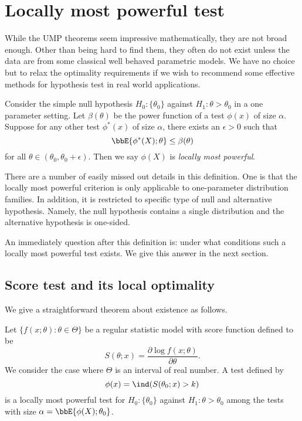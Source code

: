 \chapter{Locally most powerful test}

While the UMP theorems seem impressive mathematically,
they are not broad enough. Other than being hard to find them,
they often do not exist unless the data are from
some classical well behaved parametric models.
We have no choice but to relax the optimality requirements
if we wish to recommend some effective methods for hypothesis test
in real world applications.

\begin{defi}
Consider the simple null hypothesis $H_0: \{ \theta_0\}$
against $H_1: \theta > \theta_0$ in a one parameter setting.
Let $\beta(\theta)$ be the power function of
a test $\phi(x)$ of size $\alpha$.
Suppose for any other test $\phi^*(x)$ of size $\alpha$, 
there exists an $\epsilon > 0$ such that 
\[
\bbE\{ \phi^*(X) ; \theta\} \leq \beta(\theta)
\]
for all $\theta \in (\theta_0, \theta_0+ \epsilon)$. 
Then we say $\phi(X)$ is {\it locally most powerful}.
\end{defi}

There are a number of easily missed out details in this definition.
One is that the locally most powerful criterion is only applicable
to one-parameter distribution families. In addition, it is
restricted to specific type of null and alternative hypothesis.
Namely, the null hypothesis contains a single distribution
and the alternative hypothesis is one-sided.

An immediately question after this definition is: 
under what conditions such a locally most powerful test exists. 
We give this answer in the next section.

\section{Score test and its local optimality}

We give a straightforward theorem about existence as
follows.

\begin{theorem}
Let $\{f(x; \theta): \theta \in \Theta\}$ be a regular statistic
model with score function defined to be
\[
S(\theta; x) = \frac{\partial \log f(x; \theta) }{\partial \theta}.
\]
We consider the case where $\Theta$ is an interval of real number.
A test defined by
\[
\phi(x) =  \ind (S(\theta_0; x) > k)
\]
is a locally most powerful test for
$H_0: \{ \theta_0\}$ against $H_1: \theta > \theta_0$
among the tests with size $\alpha = \bbE\{ \phi(X); \theta_0\}$.
\end{theorem}

